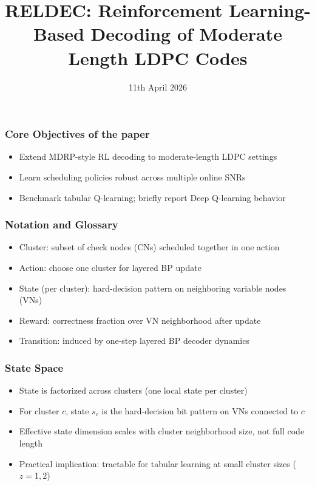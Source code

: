 \documentclass{beamer}
\title{RELDEC: Reinforcement Learning-Based Decoding of Moderate Length LDPC Codes}
\author{}
\institute{}
\date{11th April 2026}
\begin{document}
\frame{\titlepage}

\begin{frame}
\frametitle{Core Objectives of the paper}

\begin{itemize}
    \item Extend MDRP-style RL decoding to moderate-length LDPC settings
    \item Learn scheduling policies robust across multiple online SNRs
    \item Benchmark tabular Q-learning; briefly report Deep Q-learning behavior
\end{itemize}

\end{frame}


\begin{frame}
\frametitle{Notation and Glossary}

\begin{itemize}
    \item Cluster: subset of check nodes (CNs) scheduled together in one action
    \item Action: choose one cluster for layered BP update
    \item State (per cluster): hard-decision pattern on neighboring variable nodes (VNs)
    \item Reward: correctness fraction over VN neighborhood after update
    \item Transition: induced by one-step layered BP decoder dynamics
\end{itemize}

\end{frame}


\begin{frame}
\frametitle{State Space}

\begin{itemize}
    \item State is factorized across clusters (one local state per cluster)
    \item For cluster $c$, state $s_c$ is the hard-decision bit pattern on VNs connected to $c$
    \item Effective state dimension scales with cluster neighborhood size, not full code length
    \item Practical implication: tractable for tabular learning at small cluster sizes ($z=1,2$)
\end{itemize}

\end{frame}
\end{document}
